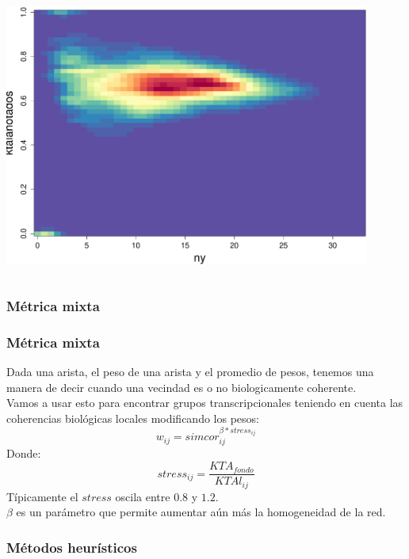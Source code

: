 \documentclass[serif,9pt, t]{beamer}
\begin{document}
\begin{frame}
\begin{columns}[T]
    \centering    
    \includegraphics[width=0.90\textwidth]{lktaanotados_vs_nyanotados.pdf}
\end{columns}
\end{frame}

\subsubsection*{Métrica mixta}
\begin{frame}\frametitle{Métrica mixta} 
Dada una arista, el peso de una arista y el promedio de pesos, tenemos una manera de decir cuando una vecindad es o no biologicamente coherente.\\
\bigskip
Vamos a usar esto para encontrar grupos transcripcionales teniendo en cuenta las coherencias biológicas locales modificando los pesos:
\bigskip
\begin{equation}
	w_{ij} = simcor_{ij}^{\beta*stress_{ij}}
\end{equation}
Donde:
\begin{equation}
	stress_{ij} = \frac{KTA_{fondo}}{KTAl_{ij}}
\end{equation}
\bigskip
Típicamente el $stress$ oscila entre $0.8$ y $1.2$.\\
\bigskip
$\beta$ es un parámetro que permite aumentar aún más la homogeneidad de la red.
\end{frame}

\subsubsection*{Métodos heurísticos}
\end{document}
